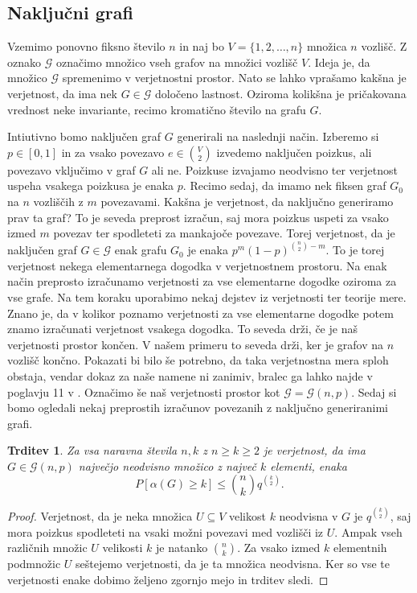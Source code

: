 \documentclass[12pt,a4paper,twoside]{article}
\theoremstyle{definition} %
\theoremstyle{plain} %
\newtheorem{trditev}[definicija]{Trditev}
\numberwithin{equation}{section}  %
\begin{document}
\subsection{Naključni grafi}
Vzemimo ponovno fiksno število $n$ in naj bo $V = \{1,2, \ldots, n\}$ množica $n$ vozlišč. Z oznako $\mathcal{G}$ označimo množico vseh grafov na množici vozlišč $V$.  Ideja je, da množico $\mathcal{G}$ spremenimo v verjetnostni prostor. Nato se lahko vprašamo kakšna je verjetnost, da ima nek $G \in \mathcal{G}$ določeno lastnost. Oziroma kolikšna je pričakovana vrednost neke invariante, recimo kromatično število na grafu $G$.

Intiutivno bomo naključen graf $G$ generirali na naslednji način. Izberemo si $p \in [0, 1]$ in za vsako povezavo $e \in {V \choose 2}$ izvedemo naključen poizkus, ali povezavo vključimo v graf $G$ ali ne. Poizkuse izvajamo neodvisno ter verjetnost uspeha vsakega poizkusa je enaka $p$. Recimo sedaj, da imamo nek fiksen graf $G_0$ na $n$ vozliščih z $m$ povezavami. Kakšna je verjetnost, da naključno generiramo prav ta graf? To je seveda preprost izračun, saj mora poizkus uspeti za vsako izmed $m$ povezav ter spodleteti za mankajoče povezave. Torej verjetnost, da je naključen graf $G \in \mathcal{G}$ enak grafu $G_0$ je enaka  $p^m (1-p)^{{n \choose 2} - m}$. To je torej verjetnost nekega elementarnega dogodka v verjetnostnem prostoru. Na enak način preprosto izračunamo verjetnosti za vse elementarne dogodke oziroma za vse grafe. Na tem koraku uporabimo nekaj dejstev iz verjetnosti ter teorije mere. Znano je, da v kolikor poznamo verjetnosti za vse elementarne dogodke potem znamo izračunati verjetnost vsakega dogodka. To seveda drži, če je naš verjetnosti prostor končen. V našem primeru to seveda drži, ker je grafov na $n$ vozlišč končno. Pokazati bi bilo še potrebno, da taka verjetnostna mera sploh obstaja, vendar dokaz za naše namene ni zanimiv, bralec ga lahko najde v poglavju 11 v \cite{maingraph}. Označimo še naš verjetnosti prostor kot $\mathcal{G} = \mathcal{G}(n, p)$. Sedaj si bomo ogledali nekaj preprostih izračunov povezanih z naključno generiranimi grafi.

\begin{trditev}
\label{indeprand}
Za vsa naravna števila $n,k$ z $n \ge k \ge 2$ je verjetnost, da ima $G \in \mathcal{G}(n,p)$ največjo neodvisno množico z največ $k$ elementi, enaka
$$ P[\alpha(G) \ge k] \le {n \choose k} q ^{k \choose 2} .$$
\end{trditev}

\begin{proof}
Verjetnost, da je neka množica $U \subseteq V$ velikost $k$ neodvisna v $G$ je $q^{k \choose 2}$, saj mora poizkus spodleteti na vsaki možni povezavi med vozlišči iz $U$. Ampak vseh različnih množic $U$ velikosti $k$ je natanko ${n \choose k}$. Za vsako izmed $k$ elementnih podmnožic $U$ seštejemo verjetnosti, da je ta množica neodvisna. Ker so vse te verjetnosti enake dobimo željeno zgornjo mejo in trditev sledi.
\end{proof}
\end{document}
